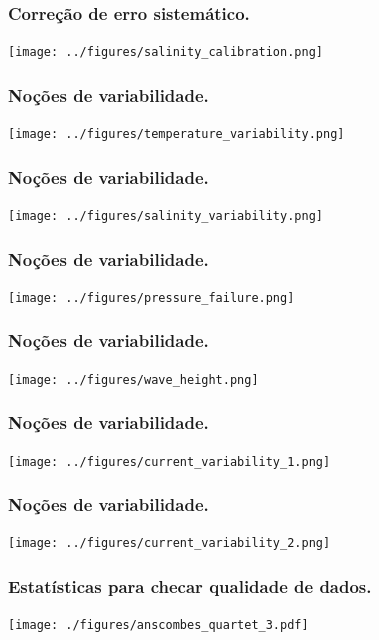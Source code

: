 \begin{frame}
\frametitle{Correção de erro sistemático.}
    \begin{center}
        \texttt{[image: ../figures/salinity\_calibration.png]}
    \end{center}
\end{frame}

\begin{frame}
\frametitle{Noções de variabilidade.}
    \begin{center}
        \texttt{[image: ../figures/temperature\_variability.png]}
    \end{center}
\end{frame}

\begin{frame}
\frametitle{Noções de variabilidade.}
    \begin{center}
        \texttt{[image: ../figures/salinity\_variability.png]}
    \end{center}
\end{frame}

\begin{frame}
\frametitle{Noções de variabilidade.}
    \begin{center}
        \texttt{[image: ../figures/pressure\_failure.png]}
    \end{center}
\end{frame}

\begin{frame}
\frametitle{Noções de variabilidade.}
    \begin{center}
        \texttt{[image: ../figures/wave\_height.png]}
    \end{center}
\end{frame}

\begin{frame}
\frametitle{Noções de variabilidade.}
    \begin{center}
        \texttt{[image: ../figures/current\_variability\_1.png]}
    \end{center}
\end{frame}

\begin{frame}
\frametitle{Noções de variabilidade.}
    \begin{center}
        \texttt{[image: ../figures/current\_variability\_2.png]}
    \end{center}
\end{frame}

\begin{frame}
\frametitle{Estatísticas para checar qualidade de dados.}
    \begin{center}
        \texttt{[image: ./figures/anscombes\_quartet\_3.pdf]}
    \end{center}
\end{frame}

